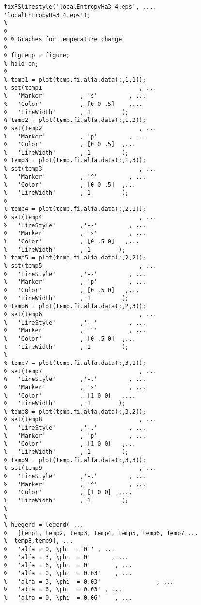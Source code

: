 \begin{lstlisting}
fixPSlinestyle('localEntropyHa3_4.eps', ....
'localEntropyHa3_4.eps');
% 
% 
% % Graphes for temperature change
% 
% figTemp = figure;
% hold on;
% 
% temp1 = plot(temp.fi.alfa.data(:,1,1));
% set(temp1                            , ...
%   'Marker'          , 's'         , ...
%   'Color'           , [0 0 .5]    ,...
%   'LineWidth'       , 1         );
% temp2 = plot(temp.fi.alfa.data(:,1,2));
% set(temp2                            , ...
%   'Marker'          , 'p'         , ...
%   'Color'           , [0 0 .5]  ,...
%   'LineWidth'       , 1         );
% temp3 = plot(temp.fi.alfa.data(:,1,3));
% set(temp3                            , ...
%   'Marker'          , '^'         , ...
%   'Color'           , [0 0 .5]  ,...
%   'LineWidth'       , 1         );
% 
% temp4 = plot(temp.fi.alfa.data(:,2,1));
% set(temp4                            , ...
%   'LineStyle'       ,'--'         , ...
%   'Marker'          , 's'         , ...
%   'Color'           , [0 .5 0]   ,...
%   'LineWidth'       , 1        );
% temp5 = plot(temp.fi.alfa.data(:,2,2));
% set(temp5                            , ...
%   'LineStyle'       ,'--'         , ...
%   'Marker'          , 'p'         , ...
%   'Color'           , [0 .5 0]   ,...
%   'LineWidth'       , 1         );
% temp6 = plot(temp.fi.alfa.data(:,2,3));
% set(temp6                            , ...
%   'LineStyle'       ,'--'         , ...
%   'Marker'          , '^'         , ...
%   'Color'           , [0 .5 0]  ,...
%   'LineWidth'       , 1         );
% 
% temp7 = plot(temp.fi.alfa.data(:,3,1));
% set(temp7                            , ...
%   'LineStyle'       ,'-.'         , ...
%   'Marker'          , 's'         , ...
%   'Color'           , [1 0 0]   ,...
%   'LineWidth'       , 1        );
% temp8 = plot(temp.fi.alfa.data(:,3,2));
% set(temp8                            , ...
%   'LineStyle'       ,'-.'         , ...
%   'Marker'          , 'p'         , ...
%   'Color'           , [1 0 0]   ,...
%   'LineWidth'       , 1         );
% temp9 = plot(temp.fi.alfa.data(:,3,3));
% set(temp9                            , ...
%   'LineStyle'       ,'-.'         , ...
%   'Marker'          , '^'         , ...
%   'Color'           , [1 0 0]  ,...
%   'LineWidth'       , 1         );
% 
% 
% hLegend = legend( ...
%   [temp1, temp2, temp3, temp4, temp5, temp6, temp7,...
%  temp8,temp9], ...
%   'alfa = 0, \phi  = 0 ' , ...
%   'alfa = 3, \phi  = 0'      , ...
%   'alfa = 6, \phi  = 0'       , ...
%   'alfa = 0, \phi  = 0.03'    , ...
%   'alfa = 3, \phi  = 0.03'                , ...
%   'alfa = 6, \phi  = 0.03' , ...
%   'alfa = 0, \phi  = 0.06'    , ...

\end{lstlisting}
